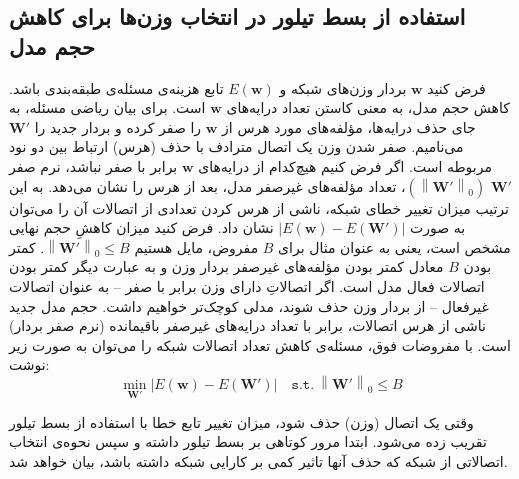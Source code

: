 \documentclass[11pt, twoside]{imsproc}
\newcommand{\norm}[1]{\left\lVert#1\right\rVert}
\begin{document}
\subsection{
استفاده از بسط تیلور در انتخاب وزن‌ها برای کاهش حجم مدل}
\label{sec:model_size_reduction_taylor}
فرض کنید
$\mathbf{w}$
بردار وزن‌های شبکه و
$E(\mathbf{w})$
تابع هزینه‌ی مسئله‌ی طبقه‌بندی باشد.
کاهش حجم مدل، به معنی کاستن تعداد درایه‌های
$\mathbf{w}$
است. برای بیان ریاضی مسئله، به جای حذف درایه‌ها، مؤلفه‌های مورد هرس از
$\mathbf{w}$
را صفر کرده و بردار جدید را
$\mathbf{W'}$
می‌نامیم. صفر شدن وزن یک اتصال مترادف با حذف  (هرس) ارتباط بین دو نود مربوطه است.
اگر فرض کنيم هيچ‌کدام از درايه‌های 
$\mathbf{w}$
برابر با صفر نباشد،
نرم صفر
$\mathbf{W'}$
$(\norm{\mathbf{W'}}_0)$،
تعداد مؤلفه‌های غیرصفر مدل، بعد از هرس را نشان می‌دهد.
به این ترتیب میزان تغییر خطای شبکه، ناشی از هرس کردن تعدادی از اتصالات آن را می‌توان به صورت
$|E(\mathbf{w})-E(\mathbf{W'})|$
نشان داد.
فرض کنید میزان کاهشِ حجم نهایی مشخص است، یعنی به عنوان مثال برای
$B$
مفروض، مایل هستیم
$\norm{\mathbf{W'}}_0 \le B$.
کمتر بودن
$B$
معادل کمتر بودن مؤلفه‌های غیرصفر بردار وزن و به عبارت دیگر کمتر بودن اتصالات فعال مدل است. اگر اتصالاتِ دارای وزن برابر با صفر -- به عنوان اتصالات غیرفعال -- از بردار وزن حذف شوند، مدلی کوچک‌تر خواهیم داشت. حجم مدل جدید ناشی از هرس اتصالات، برابر با تعداد درایه‌های غیرصفر باقیمانده‌ (نرم صفر بردار) است.
با مفروضات فوق، مسئله‌ی کاهش تعداد اتصالات شبکه را می‌توان به صورت زیر نوشت:
\begin{equation}
\min_{\mathbf{W'}} |E(\mathbf{w})-E(\mathbf{W'})| \quad \mathtt{s.t.}\  \norm{\mathbf{W'}}_0 \le B
\label{eq:minEW}
\end{equation}


%
وقتی یک اتصال (وزن) حذف شود، میزان تغییر تابع خطا با استفاده از بسط تیلور تقریب زده می‌شود.
ابتدا مرور کوتاهی بر بسط تیلور داشته و سپس نحوه‌ی انتخاب اتصالاتی از شبکه که حذف آنها تاثیر کمی بر کارایی شبکه داشته باشد، بیان خواهد شد.
\end{document}

